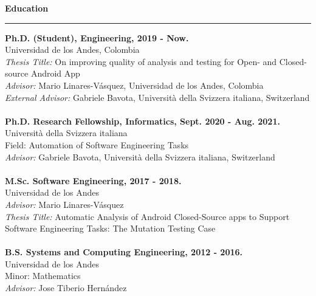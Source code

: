 \documentclass[letterpaper,11pt,oneside]{article}
\begin{document}
\noindent \Large{\textbf{Education}} \\
\vspace{-2ex}
\hrule 
\normalsize
\vspace{2ex}
\noindent \textbf{Ph.D. (Student), Engineering, 2019 - Now.} \\
	Universidad de los Andes, Colombia \\
	{\small \textit{Thesis Title:} On improving quality of analysis and testing for Open- and Closed-source Android App \\}
	\textit{Advisor:} Mario Linares-V\'{a}squez, Universidad de los Andes, Colombia \\
	\textit{External Advisor:} Gabriele Bavota, Università della Svizzera italiana, Switzerland \\
	\\
\textbf{Ph.D. Research Fellowship, Informatics, Sept. 2020 - Aug. 2021.} \\
	Università della Svizzera italiana \\
	Field: Automation of Software Engineering Tasks \\
	\textit{Advisor:} Gabriele Bavota, Università della Svizzera italiana, Switzerland \\
	\\
\textbf{M.Sc. Software Engineering, 2017 - 2018.} \\
	Universidad de los Andes \\
	\textit{Advisor:} Mario Linares-V\'{a}squez \\
	{\small \textit{Thesis Title:} Automatic Analysis of Android Closed-Source apps to Support Software Engineering Tasks: The Mutation Testing Case \\}
	\\
\textbf{B.S. Systems and Computing Engineering, 2012 - 2016.} \\
	Universidad de los Andes \\
	Minor: Mathematics \\
	\textit{Advisor:} Jose Tiberio Hern\'{a}ndez \\
	
\end{document}
